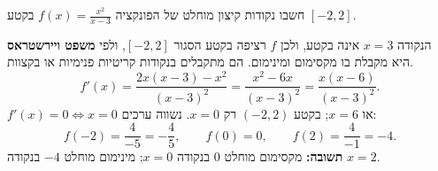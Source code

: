 
\begin{question}
חשבו נקודות קיצון מוחלט של הפונקציה $f(x)=\frac{x^2}{x-3}$ בקטע $[-2,2]$.
\end{question}

\begin{solution}
הנקודה $x=3$ אינה בקטע, ולכן $f$ רציפה בקטע הסגור $[-2,2]$, ולפי \textbf{משפט ויירשטראס} היא מקבלת בו מקסימום ומינימום. הם מתקבלים בנקודות קריטיות פנימיות או בקצוות.
\[ f'(x)=\frac{2x(x-3)-x^2}{(x-3)^2}=\frac{x^2-6x}{(x-3)^2}=\frac{x(x-6)}{(x-3)^2}. \]
$f'(x)=0\iff x=0$ או $x=6$; בקטע $(-2,2)$ רק $x=0$. נשווה ערכים:
\[ f(-2)=\frac{4}{-5}=-\frac45,\qquad f(0)=0,\qquad f(2)=\frac{4}{-1}=-4. \]
\textbf{תשובה:} מקסימום מוחלט $0$ בנקודה $x=0$; מינימום מוחלט $-4$ בנקודה $x=2$.
\end{solution}
